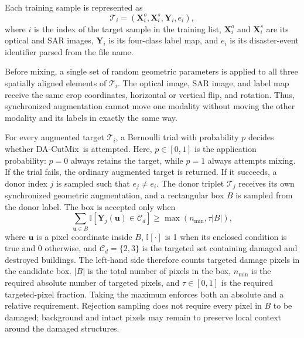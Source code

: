 \documentclass[journal]{IEEEtran}
\newcommand{\dacutmix}{DA-CutMix}
\begin{document}
    Each training sample is represented as
    \begin{equation}
        \mathcal{T}_{i} =
        \left(\mathbf{X}^{o}_{i}, \mathbf{X}^{s}_{i}, \mathbf{Y}_{i}, e_i\right),
        \label{eq:training_tuple}
    \end{equation}
    where $i$ is the index of the target sample in the training list, $\mathbf{X}^{o}_{i}$ and $\mathbf{X}^{s}_{i}$ are its optical and SAR images, $\mathbf{Y}_{i}$ is its four-class label map, and $e_i$ is its disaster-event identifier parsed from the file name.
    
    Before mixing, a single set of random geometric parameters is applied to all three spatially aligned elements of $\mathcal{T}_i$. The optical image, SAR image, and label map receive the same crop coordinates, horizontal or vertical flip, and rotation. Thus, synchronized augmentation cannot move one modality without moving the other modality and its labels in exactly the same way.
    
    For every augmented target $\mathcal{T}_i$, a Bernoulli trial with probability $p$ decides whether \dacutmix\ is attempted. Here, $p\in[0,1]$ is the application probability: $p=0$ always retains the target, while $p=1$ always attempts mixing. If the trial fails, the ordinary augmented target is returned. If it succeeds, a donor index $j$ is sampled such that $e_j\neq e_i$. The donor triplet $\mathcal{T}_j$ receives its own synchronized geometric augmentation, and a rectangular box $B$ is sampled from the donor label. The box is accepted only when
    \begin{equation}
        \sum_{\mathbf{u}\in B}
        \mathbb{I}\left[\mathbf{Y}_{j}(\mathbf{u})\in\mathcal{C}_{d}\right]
        \geq
        \max\left(n_{\min},\tau |B|\right),
        \label{eq:dacutmix_accept}
    \end{equation}
    where $\mathbf{u}$ is a pixel coordinate inside $B$, $\mathbb{I}[\cdot]$ is 1 when its enclosed condition is true and 0 otherwise, and $\mathcal{C}_{d}=\{2,3\}$ is the targeted set containing damaged and destroyed buildings. The left-hand side therefore counts targeted damage pixels in the candidate box. $|B|$ is the total number of pixels in the box, $n_{\min}$ is the required absolute number of targeted pixels, and $\tau\in[0,1]$ is the required targeted-pixel fraction. Taking the maximum enforces both an absolute and a relative requirement. Rejection sampling does not require every pixel in $B$ to be damaged; background and intact pixels may remain to preserve local context around the damaged structures.
    
\end{document}
